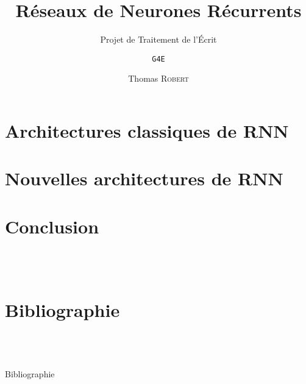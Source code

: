 \documentclass[compress,xcolor=table]{beamer}
\title{\LARGE Réseaux de Neurones Récurrents\newline{\Large \em Recurrent Neural Networks (RNN)\newline~}}
\subtitle{\large Projet de Traitement de l'Écrit}
\date{\formatdate{20}{2}{2015}}
\author{\texttt{G4E} \and Thomas \textsc{Robert}}
\institute{Université de Rouen}
\begin{document}


\section{Architectures classiques de RNN}


\section{Nouvelles architectures de RNN}


\section{Conclusion}
\subsection*{~~~~~~~~~~~~~~~}


\section{Bibliographie}
\subsection*{~~~~~~~~~~~~~~~}
\begin{frame}[allowframebreaks]{Bibliographie}
    \printbibliography[heading=none]
\end{frame}
\end{document}
